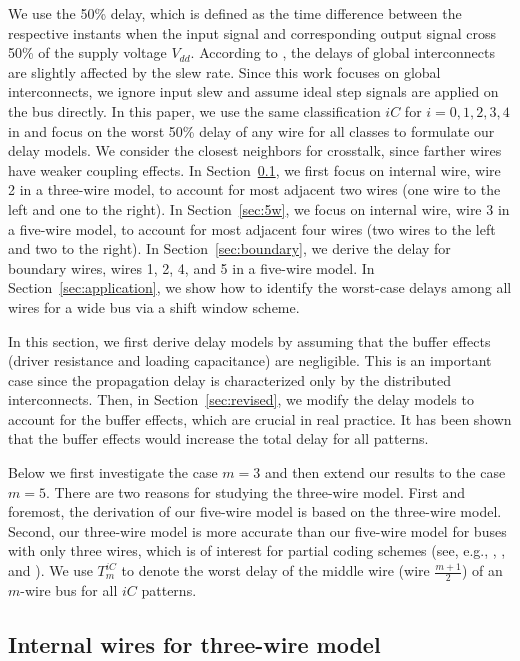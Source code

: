 \documentclass[10pt,journal]{IEEEtran}
\begin{document}
We use the 50\% delay, which is defined as the time difference between the respective instants when the input signal and corresponding output signal cross 50\% of the supply voltage $V_{dd}$. According to \cite{Kah99}, the delays of global interconnects are slightly affected by the slew rate. Since this work focuses on global interconnects, we ignore input slew and assume ideal step signals are applied on the bus directly. In this paper, we use the same classification $iC$ for $i=0,1,2,3,4$ in \cite{Sot01} and focus on the worst 50\% delay of any wire for all classes to formulate our delay models.
We consider the closest neighbors for crosstalk, since farther wires have weaker coupling effects.
In Section~\ref{sec:3m}, we first focus on internal wire, wire 2 in a three-wire model, to account for most adjacent two wires (one wire to the left and one to the right). In Section~\ref{sec:5w}, we focus on internal wire, wire 3 in a five-wire model, to account for most adjacent four wires (two wires to the left and two to the right).
In Section~\ref{sec:boundary}, we derive the delay for boundary wires, wires 1, 2, 4, and 5 in a five-wire model.
In Section~\ref{sec:application}, we show how to identify the worst-case delays among all wires for a wide bus via a shift window scheme.


In this section, we first derive delay models by assuming that the buffer effects (driver resistance and loading capacitance) are negligible. This is an important case since the propagation delay is characterized only by the distributed interconnects. Then, in Section~\ref{sec:revised}, we modify the delay models to account for the buffer effects, which are crucial in real practice. It has been shown that the buffer effects would increase the total delay for all patterns.


Below we first investigate the case $m=3$ and then extend our results to the case $m=5$. There are two reasons for studying the three-wire model. First and foremost, the derivation of our five-wire model is based on the three-wire model. Second, our three-wire model is more accurate than our five-wire model for buses with only three wires, which is of interest for partial coding schemes (see, e.g., \cite{Dua01}, \cite{Vic01}, and \cite{Sri07}).
We use $T^{iC}_m$ to denote the worst delay of the middle wire (wire $\frac{m+1}{2}$) of an $m$-wire bus for all $iC$ patterns.

\subsection{Internal wires for three-wire model}
\label{sec:3m}
\end{document}
